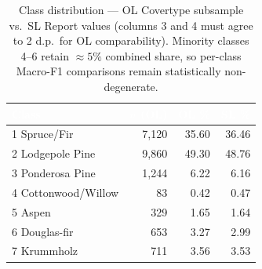 \documentclass[conference]{IEEEtran}
\begin{document}
\begin{table}[t]\centering
\caption{Class distribution --- OL Covertype subsample vs.\
SL Report values (columns 3 and 4 must agree to 2 d.p.\ for OL comparability).
Minority classes 4--6 retain ${\approx}5\%$ combined share, so per-class
Macro-F1 comparisons remain statistically non-degenerate.}
\label{tab:eda_class}
\centering\small
{}
\begin{tabularx}{\linewidth}{Xrrr}
\toprule
\rowcolor{denimdark}
\textcolor{white}{\textbf{Class}} & \textcolor{white}{\textbf{$n$ (OL)}} & \textcolor{white}{\textbf{OL \%}} & \textcolor{white}{\textbf{SL \%}} \\
\midrule
1 Spruce/Fir        & 7{,}120 & 35.60 & 36.46 \\
2 Lodgepole Pine    & 9{,}860 & 49.30 & 48.76 \\
3 Ponderosa Pine    & 1{,}244 & 6.22  & 6.16  \\
4 Cottonwood/Willow &    83   & 0.42  & 0.47  \\
5 Aspen             &   329   & 1.65  & 1.64  \\
6 Douglas-fir       &   653   & 3.27  & 2.99  \\
7 Krummholz         &   711   & 3.56  & 3.53  \\
\bottomrule
\end{tabularx}
\end{table}
\end{document}
